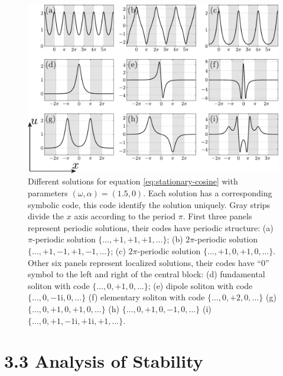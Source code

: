 \begin{figure}[h]
\centering
	\includegraphics[scale = 1]{pic/solutions for cosine equation}
	\caption{
		Different solutions for equation \eqref{eq:stationary-cosine} with parameters $(\omega, \alpha) = (1.5, 0)$.
		Each solution has a corresponding symbolic code, this code identify the solution uniquely.
		Gray strips divide the $x$ axis according to the period $\pi$.
		First three panels represent periodic solutions, their codes have periodic structure: (a) $\pi$-periodic solution $\{ \dots, +1, +1, +1, \dots \}$; (b) $2 \pi$-periodic solution $\{ \dots, +1, -1, +1, -1, \dots \}$; (c) $2 \pi$-periodic solution $\{ \dots, +1, 0, +1, 0, \dots \}$.
		Other six panels represent localized solutions, their codes have ``$0$'' symbol to the left and right of the central block: (d) fundamental soliton with code $\{ \dots, 0, +1, 0, \dots \}$; (e) dipole soliton with code $\{ \dots, 0, -1\mathrm{i}, 0, \dots \}$ (f) elementary soliton with code $\{ \dots, 0, +2, 0, \dots \}$ (g) $\{ \dots, 0, +1, 0, +1, 0, \dots \}$ (h) $\{ \dots, 0, +1, 0, -1, 0, \dots \}$ (i) $\{ \dots, 0, +1, -1\mathrm{i}, +1\mathrm{i}, +1, \dots \}$.
	}
\label{fig:solutions-cosine}
\end{figure}

\section*{3.3 Analysis of Stability}

